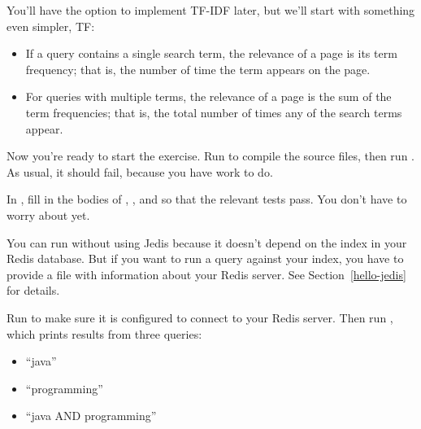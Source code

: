 \documentclass[12pt]{book}
\theoremstyle{exercise}
\begin{document}

You'll have the option to implement TF-IDF later, but we'll start with
something even simpler, TF:

\begin{itemize}

\item
  If a query contains a single search term, the relevance of a page is
  its term frequency; that is, the number of time the term appears on
  the page.

\item
  For queries with multiple terms, the relevance of a page is the sum of
  the term frequencies; that is, the total number of times any of the
  search terms appear.

\end{itemize}

Now you're ready to start the exercise.
Run  to compile the source files, then run
. As usual, it should
fail, because you have work to do.


In , fill in the bodies of ,
, and  so that the relevant tests pass. You
don't have to worry about  yet.


You can run  without using Jedis because it
doesn't depend on the index in your Redis database. But if you want to
run a query against your index, you have to provide a file with
information about your Redis server.  See Section~\ref{hello-jedis}
for details.


Run  to make sure it is configured to connect to
your Redis server. Then run , which prints results
from three queries:

\begin{itemize}

\item
  ``java''

\item
  ``programming''

\item
  ``java AND programming''

\end{itemize}
\end{document}
